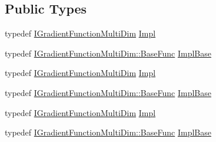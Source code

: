 \subsection*{Public Types}
\begin{DoxyCompactItemize}
\item 
typedef \mbox{\hyperlink{classROOT_1_1Math_1_1IGradientFunctionMultiDim}{I\+Gradient\+Function\+Multi\+Dim}} \mbox{\hyperlink{classROOT_1_1Math_1_1GradFunctor_a4ce94e1b525d38a2d7da3c88ace6e0f9}{Impl}}
\item 
typedef \mbox{\hyperlink{classROOT_1_1Math_1_1IGradientFunctionMultiDim_a803074495bafb5acf9f130b648001609}{I\+Gradient\+Function\+Multi\+Dim\+::\+Base\+Func}} \mbox{\hyperlink{classROOT_1_1Math_1_1GradFunctor_a1fb9161fc93c7e7fa185dddbcc2c4f4d}{Impl\+Base}}
\item 
typedef \mbox{\hyperlink{classROOT_1_1Math_1_1IGradientFunctionMultiDim}{I\+Gradient\+Function\+Multi\+Dim}} \mbox{\hyperlink{classROOT_1_1Math_1_1GradFunctor_a4ce94e1b525d38a2d7da3c88ace6e0f9}{Impl}}
\item 
typedef \mbox{\hyperlink{classROOT_1_1Math_1_1IGradientFunctionMultiDim_a803074495bafb5acf9f130b648001609}{I\+Gradient\+Function\+Multi\+Dim\+::\+Base\+Func}} \mbox{\hyperlink{classROOT_1_1Math_1_1GradFunctor_a1fb9161fc93c7e7fa185dddbcc2c4f4d}{Impl\+Base}}
\item 
typedef \mbox{\hyperlink{classROOT_1_1Math_1_1IGradientFunctionMultiDim}{I\+Gradient\+Function\+Multi\+Dim}} \mbox{\hyperlink{classROOT_1_1Math_1_1GradFunctor_a4ce94e1b525d38a2d7da3c88ace6e0f9}{Impl}}
\item 
typedef \mbox{\hyperlink{classROOT_1_1Math_1_1IGradientFunctionMultiDim_a803074495bafb5acf9f130b648001609}{I\+Gradient\+Function\+Multi\+Dim\+::\+Base\+Func}} \mbox{\hyperlink{classROOT_1_1Math_1_1GradFunctor_a1fb9161fc93c7e7fa185dddbcc2c4f4d}{Impl\+Base}}
\end{DoxyCompactItemize}
